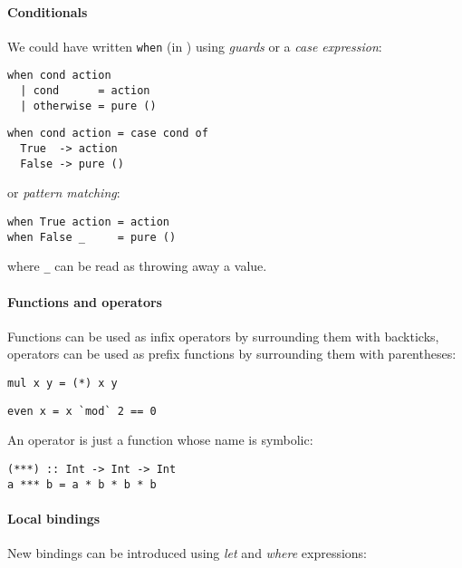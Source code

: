 \paragraph{Conditionals}
We could have written \verb|when| (in ) using \emph{guards} or a
\emph{case expression}:

\begin{multicols}{2}
\begin{verbatim}
when cond action
  | cond      = action
  | otherwise = pure ()
\end{verbatim}
\begin{verbatim}
when cond action = case cond of
  True  -> action
  False -> pure ()
\end{verbatim}
\end{multicols}

\noindent
or \emph{pattern matching}:

\begin{verbatim}
when True action = action
when False _     = pure ()
\end{verbatim}

\noindent
where \verb|_| can be read as throwing away a value.

\paragraph{Functions and operators}
Functions can be used as infix operators by surrounding them with backticks,
operators can be used as prefix functions by surrounding them with parentheses:

\begin{multicols}{2}
\begin{verbatim}
mul x y = (*) x y
\end{verbatim}
\begin{verbatim}
even x = x `mod` 2 == 0
\end{verbatim}
\end{multicols}

An operator is just a function whose name is symbolic:

\begin{verbatim}
(***) :: Int -> Int -> Int
a *** b = a * b * b * b
\end{verbatim}

\paragraph{Local bindings}
New bindings can be introduced using \emph{let} and \emph{where} expressions:

